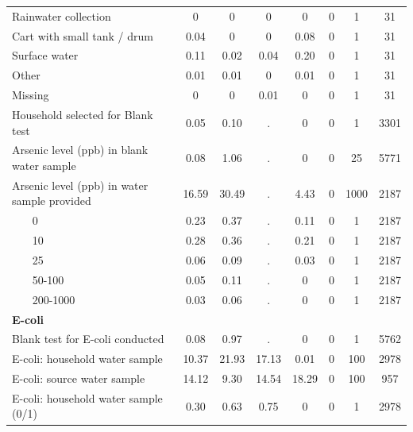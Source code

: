 \begin{table}[htbp]
\begin{tabular}{l*{7}{c}}
Rainwater collection&        0 &        0 &        0 &        0 &        0 &        1 &       31 \\
Cart with small tank / drum&        0.04&        0 &        0 &        0.08&        0 &        1 &       31 \\
Surface water&        0.11&        0.02&        0.04&        0.20&        0 &        1 &       31 \\
Other               &        0.01&        0.01&        0 &        0.01&        0 &        1 &       31 \\
Missing             &        0 &        0 &        0.01&        0 &        0 &        1 &       31 \\
Household selected for Blank test&        0.05&        0.10&           .&        0 &        0 &        1 &     3301 \\
Arsenic level (ppb) in blank water sample&        0.08&        1.06&           .&        0 &        0 &       25 &     5771 \\
Arsenic level (ppb) in water sample provided&       16.59&       30.49&           .&        4.43&        0 &     1000 &     2187 \\
~~~ 0    &        0.23&        0.37&           .&        0.11&        0 &        1 &     2187 \\
~~~ 10   &        0.28&        0.36&           .&        0.21&        0 &        1 &     2187 \\
~~~ 25   &        0.06&        0.09&           .&        0.03&        0 &        1 &     2187 \\
~~~ 50-100&        0.05&        0.11&           .&        0 &        0 &        1 &     2187 \\
~~~ 200-1000&        0.03&        0.06&           .&        0 &        0 &        1 &     2187 \\
\textbf{E-coli} \\\hline Blank test for E-coli conducted&        0.08&        0.97&           .&        0 &        0 &        1 &     5762 \\
E-coli: household water sample&       10.37&       21.93&       17.13&        0.01&        0 &      100 &     2978 \\
E-coli: source water sample&       14.12&        9.30&       14.54&       18.29&        0 &      100 &      957 \\
E-coli: household water sample (0/1)&        0.30&        0.63&        0.75&        0 &        0 &        1 &     2978 \\

\end{tabular}
\end{table}
